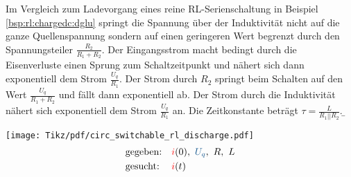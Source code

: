 \begin{frame}[t]
{    Im Vergleich zum Ladevorgang eines reine RL-Serienschaltung in Beispiel \ref{bsp:rl:chargedc:dglu} springt die Spannung
    über der Induktivität nicht auf die ganze Quellenspannung sondern auf einen geringeren Wert begrenzt durch den Spannungsteiler $\frac{R_2}{R_1+R_2}$.
    Der Eingangsstrom macht bedingt durch die Eisenverluste einen Sprung zum Schaltzeitpunkt und nähert sich dann exponentiell dem Strom $\frac{U_q}{R_1}$.
    Der Strom durch $R_2$ springt beim Schalten auf den Wert $\frac{U_q}{R_1+R_2}$ und fällt dann exponentiell ab.
    Der Strom durch die Induktivität nähert sich exponentiell dem Strom $\frac{U_q}{R_1}$ an. Die Zeitkonstante beträgt $\tau=\frac{L}{R_1||R_2}$.
}%
\b{%
\begin{minipage}{\textwidth}\centering
\begin{minipage}[t][][t]{0.48\textwidth}\centering\vspace{0cm}%
    \texttt{[image: Tikz/pdf/circ\_switchable\_rl\_discharge.pdf]}%
    \begin{equation*}\begin{aligned}
        &\text{gegeben:}&       &\eci{i}(0),\ \ecv{U_q},\ R,\ L \\
        &\text{gesucht:}&       &\eci{i}(t)
    \end{aligned}\end{equation*}
\end{minipage}
\begin{minipage}[t][][t]{0.48\textwidth}\centering\vspace{0cm}%
\end{minipage}
\end{minipage}
%
}%
\end{frame}

